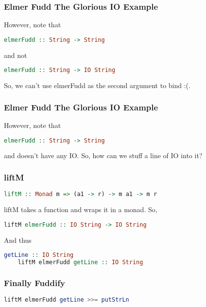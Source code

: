 \documentclass[presentation.tex]{subfiles}
\begin{document}
\begin{frame}[fragile]
  \frametitle{Elmer Fudd The Glorious IO Example}

  However, note that

  \begin{lstlisting}[frame=single,language=Haskell,breaklines=true]
    elmerFudd :: String -> String
  \end{lstlisting}

  and not

  \begin{lstlisting}[frame=single,language=Haskell,breaklines=true]
    elmerFudd :: String -> IO String
  \end{lstlisting}

  So, we can't use elmerFudd as the second argument to bind :(.
\end{frame}

\begin{frame}[fragile]
  \frametitle{Elmer Fudd The Glorious IO Example}

  However, note that

  \begin{lstlisting}[frame=single,language=Haskell,breaklines=true]
    elmerFudd :: String -> String
  \end{lstlisting}

  and doesn't have any IO. So, how can we stuff a line of IO into it?
\end{frame}

\begin{frame}[fragile]
  \frametitle{liftM}

  \begin{lstlisting}[frame=single,language=Haskell,breaklines=true]
    liftM :: Monad m => (a1 -> r) -> m a1 -> m r
  \end{lstlisting}

  liftM takes a function and wraps it in a monad. So,

  \begin{lstlisting}[frame=single,language=Haskell,breaklines=true]
    liftM elmerFudd :: IO String -> IO String
  \end{lstlisting}

  And thus

  \begin{lstlisting}[frame=single,language=Haskell,breaklines=true]
    getLine :: IO String
    liftM elmerFudd getLine :: IO String
  \end{lstlisting}
\end{frame}

\begin{frame}[fragile]
  \frametitle{Finally Fuddify}

  \begin{lstlisting}[frame=single,language=Haskell,breaklines=true]
    liftM elmerFudd getLine >>= putStrLn
  \end{lstlisting}
\end{frame}
\end{document}
